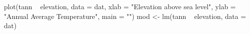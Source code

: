 \begin{Schunk}
\begin{Sinput}
 plot(tann ~ elevation, data = dat, xlab = "Elevation above sea level", ylab = "Annual Average Temperature", 
      main = "")
 mod <- lm(tann ~ elevation, data = dat)
\end{Sinput}
\end{Schunk}
